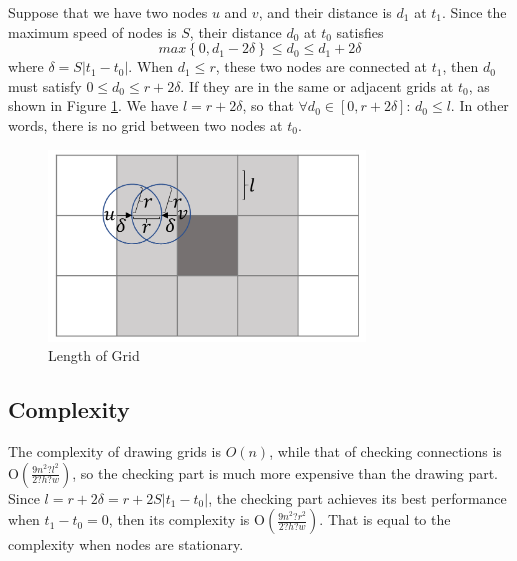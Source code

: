 \noindent Suppose that we have two nodes $u$ and $v$, and their distance is $d_1$ at $t_1$. Since the maximum speed of nodes is $S$, their distance $d_0$ at $t_0$ satisfies
\[max\left\{0,d_1-2\delta \right\}\le d_0\le d_1+2\delta \] 
where $\delta =S\left|t_1-t_0\right|$. When $d_1\le r$, these two nodes are connected at $t_1$, then $d_0$ must satisfy $0\le d_0\le r+2\delta $. If they are in the same or adjacent grids at $t_0$, as shown in Figure \ref{fig:F54LengthofGrid}. We have $l=r+2\delta $, so that $\mathrm{\forall }d_0\in \left[0,r+2\delta \right]$: $d_0\le l$. In other words, there is no grid between two nodes at $t_0$. 

\begin{figure} [hbtp]
  \centering 
  \includegraphics[height=2in]{figures/F54LengthofGrid.png}
  \caption{Length of Grid} 
  \label{fig:F54LengthofGrid} %
\end{figure}

\subsection{Complexity}

\noindent The complexity of drawing grids is $O\left(n\right)$, while that of checking connections is $\mathrm{O}\left(\frac{9n^2\mathrm{?}l^2}{2\mathrm{?}h\mathrm{?}w}\right)$, so the checking part is much more expensive than the drawing part. Since $l=r+2\delta =r+2S\left|t_1-t_0\right|$, the checking part achieves its best performance when $t_1-t_0=0$, then its complexity is $\mathrm{O}\left(\frac{9n^2\mathrm{?}r^2}{2\mathrm{?}h\mathrm{?}w}\right)$. That is equal to the complexity when nodes are stationary.
















